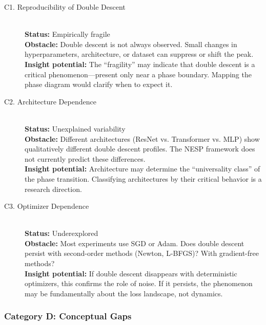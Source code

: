 \documentclass[
  journal=largetwo,
  year=2025,
  volume=37,
]{cup-journal}
\begin{document}
\begin{description}
    \item[C1. Reproducibility of Double Descent] \hfill \\
    \textbf{Status:} Empirically fragile \\
    \textbf{Obstacle:} Double descent is not always observed. Small changes in hyperparameters, architecture, or dataset can suppress or shift the peak. \\
    \textbf{Insight potential:} The ``fragility'' may indicate that double descent is a critical phenomenon---present only near a phase boundary. Mapping the phase diagram would clarify when to expect it.
    
    \item[C2. Architecture Dependence] \hfill \\
    \textbf{Status:} Unexplained variability \\
    \textbf{Obstacle:} Different architectures (ResNet vs. Transformer vs. MLP) show qualitatively different double descent profiles. The NESP framework does not currently predict these differences. \\
    \textbf{Insight potential:} Architecture may determine the ``universality class'' of the phase transition. Classifying architectures by their critical behavior is a research direction.
    
    \item[C3. Optimizer Dependence] \hfill \\
    \textbf{Status:} Underexplored \\
    \textbf{Obstacle:} Most experiments use SGD or Adam. Does double descent persist with second-order methods (Newton, L-BFGS)? With gradient-free methods? \\
    \textbf{Insight potential:} If double descent disappears with deterministic optimizers, this confirms the role of noise. If it persists, the phenomenon may be fundamentally about the loss landscape, not dynamics.
\end{description}

\subsubsection{Category D: Conceptual Gaps}
\end{document}
